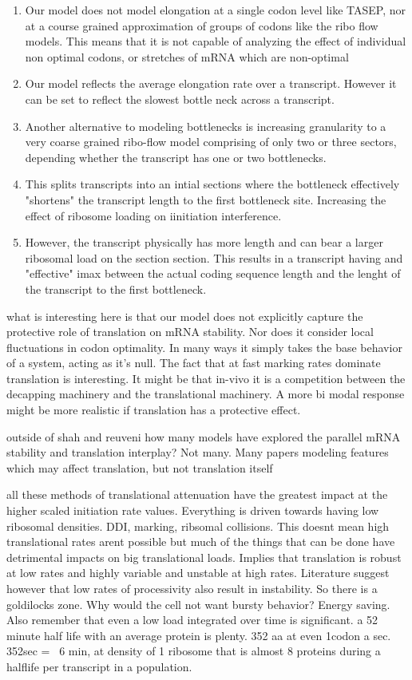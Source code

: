\documentclass[review]{elsarticle}
\begin{document}
\begin{enumerate}
	\item Our model does not model elongation at a single codon level like TASEP, nor at a course grained approximation of groups of codons like the ribo flow models. This means that it is not capable of analyzing the effect of individual non optimal codons, or stretches of mRNA which are non-optimal
	\item Our model reflects the average elongation rate over a transcript. However it can be set to reflect the slowest bottle neck across a transcript.  
	\item Another alternative to modeling bottlenecks is increasing granularity to a very coarse grained ribo-flow model comprising of only two or three sectors, depending whether the transcript has one or two bottlenecks. 
	\item This splits transcripts into an intial sections where the bottleneck effectively "shortens" the transcript length to the first bottleneck site. Increasing the effect of ribosome loading on iinitiation interference. 
	\item However, the transcript physically has more length and can bear a larger ribosomal load on the section section. This results in a transcript having and "effective" imax between the actual coding sequence length and the lenght of the transcript to the first bottleneck. 

\end{enumerate}


what is interesting here is that our model does not explicitly capture the protective role of translation on mRNA stability. Nor does it consider local fluctuations in codon optimality. In many ways it simply takes the base behavior of a system, acting as it's null. The fact that at fast marking rates dominate translation is interesting. It might be that in-vivo it is a competition between the decapping machinery and the translational machinery. A more bi modal response might be more realistic if translation has a protective effect. 

outside of shah and reuveni how many models have explored the parallel mRNA stability and translation interplay? Not many. Many papers modeling features which may affect translation, but not translation itself

all these methods of translational attenuation have the greatest impact at the higher scaled initiation rate values. Everything is driven towards having low ribosomal densities. DDI, marking, ribsomal collisions. This doesnt mean high translational rates arent possible but much of the things that can be done have detrimental impacts on big translational loads. 
Implies that translation is robust at low rates and highly variable and unstable at high rates. Literature suggest however that low rates of processivity also result in instability. So there is a goldilocks zone. Why would the cell not want bursty behavior? Energy saving. Also remember that even a low load integrated over time is significant. a 52 minute half life with an average protein is plenty. 352 aa at even 1codon a sec. 352sec = ~6 min, at density of 1 ribosome that is almost 8 proteins during a halflife per transcript in a population.
\end{document}
